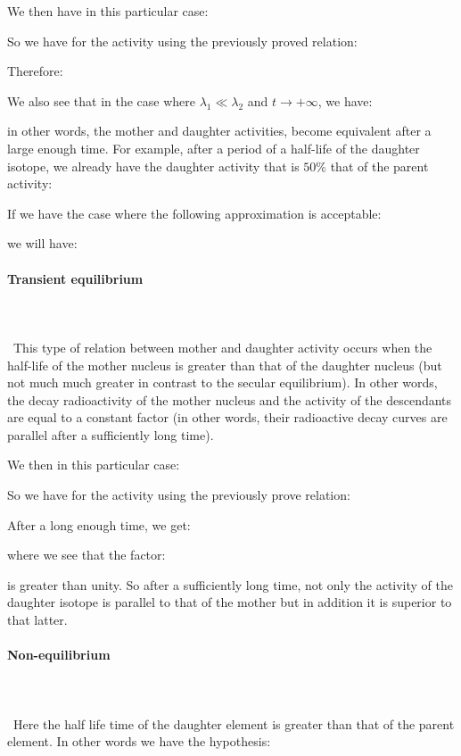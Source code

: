 	We then have in this particular case:
	
	So we have for the activity using the previously proved relation:
	
	Therefore:
	
	We also see that in the case where $\lambda_1\ll\lambda_2$ and $t\rightarrow +\infty$, we have:
	
	in other words, the mother and daughter activities, become equivalent after a large enough time. For example, after a period of a half-life of the daughter isotope, we already have the daughter activity that is $50\%$ that of the parent activity:
	
	If we have the case where the following approximation is acceptable:
	
	we will have:
	
	
	\pagebreak
	\paragraph{Transient equilibrium}\mbox{}\\\\\
	This type of relation between mother and daughter activity occurs when the half-life of the mother nucleus is greater than that of the daughter nucleus (but not much much greater in contrast to the secular equilibrium). In other words, the decay radioactivity of the mother nucleus and the activity of the descendants are equal to a constant factor (in other words, their radioactive decay curves are parallel after a sufficiently long time).

	We then in this particular case:
	
	So we have for the activity using the previously prove relation:
	
	After a long enough time, we get:
	
	where we see that the factor:
	
	is greater than unity. So after a sufficiently long time, not only the activity of the daughter isotope is parallel to that of the mother but in addition it is superior to that latter.
	
	\paragraph{Non-equilibrium}\mbox{}\\\\\
	Here the half life time of the daughter element is greater than that of the parent element. In other words we have the hypothesis:
	
